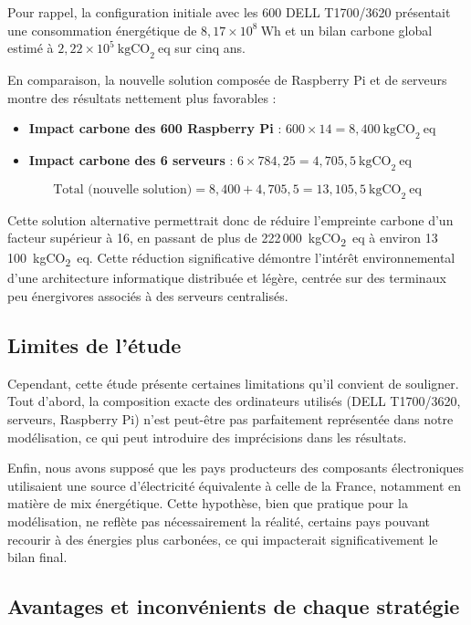 Pour rappel, la configuration initiale avec les 600 DELL T1700/3620 présentait une consommation énergétique de \(8{,}17 \times 10^8~\text{Wh}\) et un bilan carbone global estimé à \(2{,}22 \times 10^5~\text{kgCO}_2~\text{eq}\) sur cinq ans.

En comparaison, la nouvelle solution composée de Raspberry Pi et de serveurs montre des résultats nettement plus favorables :
\begin{itemize}
    \item \textbf{Impact carbone des 600 Raspberry Pi} : \(600 \times 14 = 8{,}400~\text{kgCO}_2~\text{eq}\)
    \item \textbf{Impact carbone des 6 serveurs} : \(6 \times 784{,}25 = 4{,}705{,}5~\text{kgCO}_2~\text{eq}\)
\end{itemize}

\[
\text{Total (nouvelle solution)} = 8{,}400 + 4{,}705{,}5 = 13{,}105{,}5~\text{kgCO}_2~\text{eq}
\]

Cette solution alternative permettrait donc de réduire l’empreinte carbone d’un facteur supérieur à 16, en passant de plus de 222\,000~kgCO\textsubscript{2}~eq à environ 13\,100~kgCO\textsubscript{2}~eq. Cette réduction significative démontre l’intérêt environnemental d’une architecture informatique distribuée et légère, centrée sur des terminaux peu énergivores associés à des serveurs centralisés.

\subsection*{Limites de l’étude}

Cependant, cette étude présente certaines limitations qu’il convient de souligner. Tout d’abord, la composition exacte des ordinateurs utilisés (DELL T1700/3620, serveurs, Raspberry Pi) n’est peut-être pas parfaitement représentée dans notre modélisation, ce qui peut introduire des imprécisions dans les résultats.

Enfin, nous avons supposé que les pays producteurs des composants électroniques utilisaient une source d’électricité équivalente à celle de la France, notamment en matière de mix énergétique. Cette hypothèse, bien que pratique pour la modélisation, ne reflète pas nécessairement la réalité, certains pays pouvant recourir à des énergies plus carbonées, ce qui impacterait significativement le bilan final.

\subsection*{Avantages et inconvénients de chaque stratégie}

